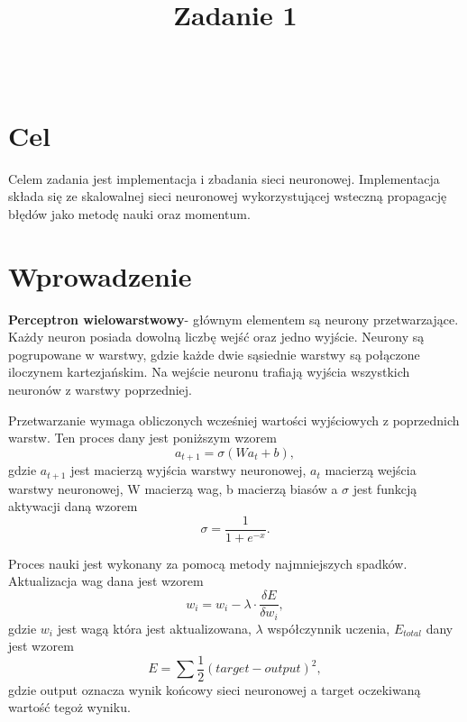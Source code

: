 \documentclass{classrep}
\author{%
  \studentinfo[215145@edu.p.lodz.pl]{Michał Chudzik}{215145}\\
  \studentinfo[210320@edu.p.lodz.pl]{Michał Sobczyk}{210320}%
}
\title{Zadanie 1}
\begin{document}
\maketitle
\thispagestyle{fancyplain}

\section{Cel}
	Celem zadania jest implementacja i zbadania sieci neuronowej. Implementacja składa się ze skalowalnej sieci neuronowej wykorzystującej wsteczną propagację błędów jako metodę nauki oraz momentum.

\section{Wprowadzenie}
	\textbf{Perceptron wielowarstwowy}-  głównym elementem są neurony przetwarzające. Każdy neuron posiada dowolną liczbę wejść oraz jedno wyjście. Neurony są pogrupowane w warstwy, gdzie każde dwie sąsiednie warstwy są połączone iloczynem kartezjańskim. Na wejście neuronu trafiają wyjścia wszystkich neuronów z warstwy poprzedniej.


Przetwarzanie wymaga obliczonych wcześniej wartości wyjściowych z poprzednich warstw. Ten proces dany jest poniższym wzorem
\begin{equation} \label{eq:feedforward}
	a_{t+1} = \sigma ( Wa_t + b),
\end{equation}
gdzie $a_{t+1}$ jest macierzą wyjścia warstwy neuronowej, $a_t$ macierzą wejścia warstwy neuronowej, W macierzą wag, b macierzą biasów a $\sigma$ jest funkcją aktywacji daną wzorem
\begin{equation} \label{eq:activation}
	\sigma = \frac{1}{1 + e^{-x}}.
\end{equation}


Proces nauki jest wykonany za pomocą metody najmniejszych spadków. Aktualizacja wag dana jest wzorem
\begin{equation} \label{eq:generalBackPropagationWeight}
	w_i = w_i - \lambda \cdot \frac{\delta E}{\delta w_i},
\end{equation}
gdzie $w_i$ jest wagą która jest aktualizowana, $\lambda$ współczynnik uczenia, $E_{total}$ dany jest wzorem
\begin{equation} \label{eq:totalError}
	E = \sum \frac{1}{2}(target - output)^2,
\end{equation}
gdzie output oznacza wynik końcowy sieci neuronowej a target oczekiwaną wartość tegoż wyniku.
\end{document}
